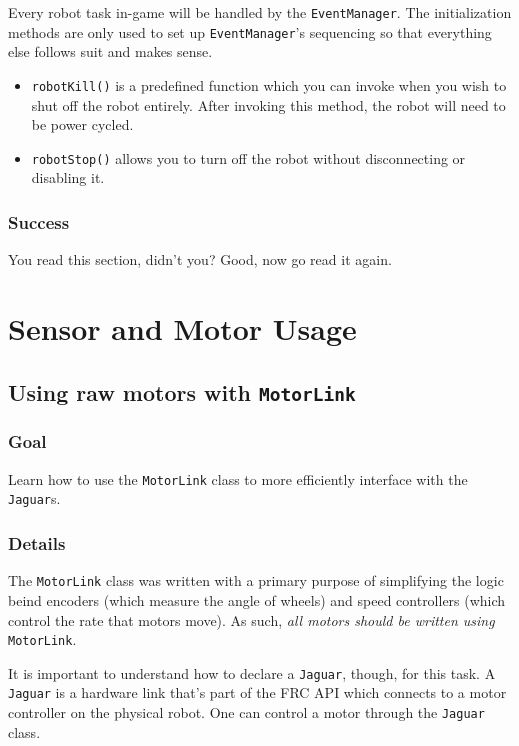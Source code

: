 \documentclass[a4paper]{article}
\begin{document}
Every robot task in-game will be handled by the \lstinline{EventManager}. The initialization methods are only used to set up \lstinline{EventManager}'s sequencing so that everything else follows suit and makes sense. \begin{itemize}\item{\lstinline{robotKill()} is a predefined function which you can invoke when you wish to shut off the robot entirely. After invoking this method, the robot will need to be power cycled.}\item{\lstinline{robotStop()} allows you to turn off the robot without disconnecting or disabling it.}\end{itemize}
\setcounter{subsubsection}{3}\subsubsection{Success} You read this section, didn't you? Good, now go read it again.


\pagebreak\section{Sensor and Motor Usage}\setcounter{subsection}{3}

\subsection{Using raw motors with \lstinline{MotorLink}}
\subsubsection{Goal} Learn how to use the \lstinline{MotorLink} class to more efficiently interface with the \lstinline{Jaguar}s.
\subsubsection{Details} The \lstinline{MotorLink} class was written with a primary purpose of simplifying the logic beind encoders (which measure the angle of wheels) and speed controllers (which control the rate that motors move). As such, \textit{all motors should be written using} \lstinline{MotorLink}. 

It is important to understand how to declare a \lstinline{Jaguar}, though, for this task. A \lstinline{Jaguar} is a hardware link that's part of the FRC API which connects to a motor controller on the physical robot. One can control a motor through the \lstinline{Jaguar} class.
\end{document}

